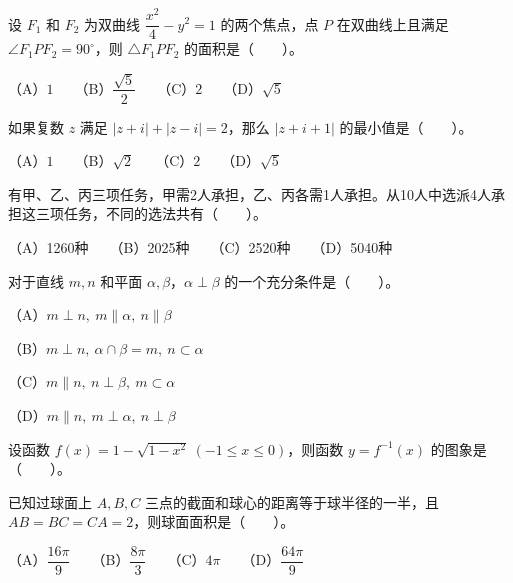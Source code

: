 \begin{question}
设 $F_1$ 和 $F_2$ 为双曲线 $\dfrac{x^2}{4}-y^2=1$ 的两个焦点，点 $P$ 在双曲线上且满足 $\angle F_1PF_2=90^\circ$，则 $\triangle F_1PF_2$ 的面积是\mbox{（　　）}。

（A）$1$　　（B）$\dfrac{\sqrt5}{2}$　　（C）$2$　　（D）$\sqrt5$

\end{question}
\begin{question}
如果复数 $z$ 满足 $|z+i|+|z-i|=2$，那么 $|z+i+1|$ 的最小值是\mbox{（　　）}。

（A）$1$　　（B）$\sqrt2$　　（C）$2$　　（D）$\sqrt5$

\end{question}
\begin{question}
有甲、乙、丙三项任务，甲需2人承担，乙、丙各需1人承担。从10人中选派4人承担这三项任务，不同的选法共有\mbox{（　　）}。

（A）1260种　　（B）2025种　　（C）2520种　　（D）5040种

\end{question}
\begin{question}
对于直线 $m,n$ 和平面 $\alpha,\beta$，$\alpha\perp\beta$ 的一个充分条件是\mbox{（　　）}。

（A）$m\perp n,\ m\parallel\alpha,\ n\parallel\beta$

（B）$m\perp n,\ \alpha\cap\beta=m,\ n\subset\alpha$

（C）$m\parallel n,\ n\perp\beta,\ m\subset\alpha$

（D）$m\parallel n,\ m\perp\alpha,\ n\perp\beta$

\Needspace{0.4\textheight}
\end{question}
\begin{question}
设函数 $f(x)=1-\sqrt{1-x^2}\ (-1\le x\le0)$，则函数 $y=f^{-1}(x)$ 的图象是\mbox{（　　）}。
\nopagebreak[4]
\begin{center}\end{center}
\nopagebreak[4]
\end{question}
\begin{question}
已知过球面上 $A,B,C$ 三点的截面和球心的距离等于球半径的一半，且 $AB=BC=CA=2$，则球面面积是\mbox{（　　）}。

（A）$\dfrac{16\pi}{9}$　　（B）$\dfrac{8\pi}{3}$　　（C）$4\pi$　　（D）$\dfrac{64\pi}{9}$

\end{question}
